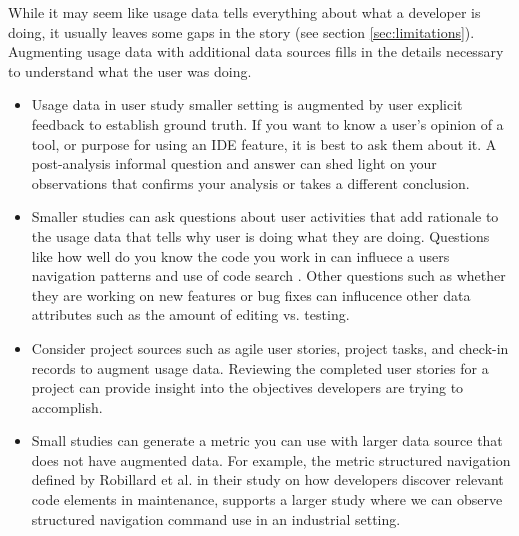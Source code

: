 While it may seem like usage data tells everything about what a developer is doing, it usually leaves some gaps in the story (see section \ref{sec:limitations}).  Augmenting usage data with additional data sources fills in the details necessary to understand what the user was doing.  
    \begin{itemize}
\item
	Usage data in user study smaller setting is augmented by user explicit feedback to establish ground truth.  If you want to know a user's opinion of a tool, or purpose for using an IDE feature, it is best to ask them about it.  A post-analysis informal question and answer can shed light on your observations that confirms your analysis or takes a different conclusion.
\item
	Smaller studies can ask questions about user activities that add rationale to the usage data that tells why user is doing what they are doing.   Questions like how well do you know the code you work in can influece a users navigation patterns and use of code search \cite{wbsnipesthesis}.  Other questions such as whether they are working on new features or bug fixes can influcence other data attributes such as the amount of editing vs. testing.
\item
	Consider project sources such as agile user stories, project tasks, and check-in records to augment usage data.   Reviewing the completed user stories for a project can provide insight into the objectives developers are trying to accomplish.  
\item
	Small studies can generate a metric you can use with larger data source that does not have augmented data.  For example, the metric structured navigation defined by Robillard et al.  in their study on how developers discover relevant code elements in maintenance\cite{wbsnipes:Robillard2004How}, supports a larger study where we can observe structured navigation command use in an industrial setting.  
    \end{itemize}
    